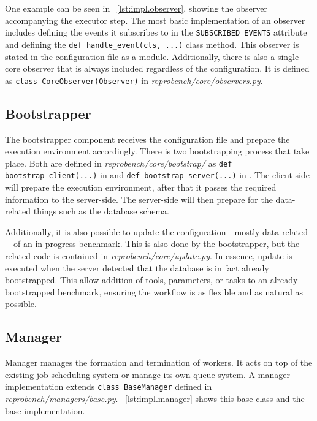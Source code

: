 One example can be seen in \lst~\ref{lst:impl.observer}, showing the observer accompanying the executor step.
The most basic implementation of an observer includes defining the events it subscribes to in the \texttt{SUBSCRIBED_EVENTS} attribute and defining the \texttt{def handle_event(cls, ...)} class method.
This observer is stated in the configuration file as a module.
Additionally, there is also a single core observer that is always included regardless of the configuration.
It is defined as \texttt{class CoreObserver(Observer)} in \emph{reprobench/core/observers.py}.

\subsection{Bootstrapper}

The bootstrapper component receives the configuration file and prepare the execution environment accordingly.
There is two bootstrapping process that take place.
Both are defined in \emph{reprobench/core/bootstrap/} as \texttt{def bootstrap_client(...)} in  and \texttt{def bootstrap_server(...)} in .
The client-side will prepare the execution environment, after that it passes the required information to the server-side.
The server-side will then prepare for the data-related things such as the database schema.

Additionally, it is also possible to update the configuration---mostly data-related---of an in-progress benchmark.
This is also done by the bootstrapper, but the related code is contained in \emph{reprobench/core/update.py}.
In essence, update is executed when the server detected that the database is in fact already bootstrapped.
This allow addition of tools, parameters, or tasks to an already bootstrapped benchmark, ensuring the workflow is as flexible and as natural as possible.

\subsection{Manager}

Manager manages the formation and termination of workers.
It acts on top of the existing job scheduling system or manage its own queue system.
A manager implementation extends \texttt{class BaseManager} defined in \emph{reprobench/managers/base.py}.
\lst~\ref{lst:impl.manager} shows this base class and the base implementation.

